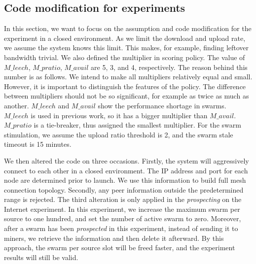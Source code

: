 %

\subsection{Code modification for experiments}
\label{section:predlsetup}
In this section, we want to focus on the assumption and code modification for the experiment in a closed environment. As we limit the download and upload rate, we assume the system knows this limit. This makes, for example, finding leftover bandwidth trivial. We also defined the multiplier in scoring policy. The value of $M\_leech$, $M\_pratio$, $M\_avail$ are 5, 3, and 4, respectively. The reason behind this number is as follows. We intend to make all multipliers relatively equal and small. However, it is important to distinguish the features of the policy. The difference between multipliers should not be so significant, for example as twice as much as another. $M\_leech$ and $M\_avail$ show the performance shortage in swarms. $M\_leech$ is used in previous work, so it has a bigger multiplier than $M\_avail$. $M\_pratio$ is a tie-breaker, thus assigned the smallest multiplier. For the swarm stimulation, we assume the upload ratio threshold is 2, and the swarm stale timeout is 15 minutes.

We then altered the code on three occasions. Firstly, the system will aggressively connect to each other in a closed environment. The IP address and port for each node are determined prior to launch. We use this information to build full mesh connection topology. Secondly, any peer information outside the predetermined range is rejected. The third alteration is only applied in the \textit{prospecting} on the Internet experiment. In this experiment, we increase the maximum swarm per source to one hundred, and set the number of active swarm to zero. Moreover, after a swarm has been \textit{prospected} in this experiment, instead of sending it to miners, we retrieve the information and then delete it afterward. By this approach, the swarm per source slot will be freed faster, and the experiment results will still be valid. 


